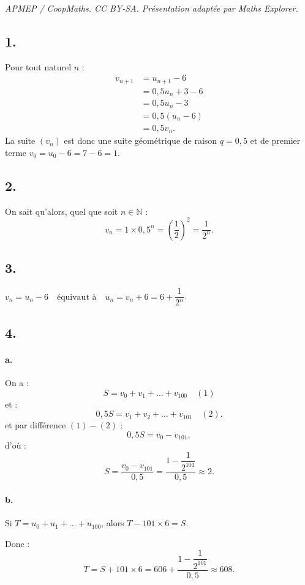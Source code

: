 \documentclass[10pt]{article}
\begin{document}
\noindent\textit{APMEP / CoopMaths. CC BY-SA. Présentation adaptée par Maths Explorer.}\par\medskip
\subsection*{1.}

Pour tout naturel \(n\) :
\begin{align*}
v_{n+1} &= u_{n+1} - 6 \\
&= 0{,}5u_n + 3 - 6 \\
&= 0{,}5u_n - 3 \\
&= 0{,}5(u_n - 6) \\
&= 0{,}5v_n.
\end{align*}
La suite \((v_n)\) est donc une suite géométrique de raison \(q = 0{,}5\) et de premier terme \( v_0 = u_0 - 6 = 7 - 6 = 1 \).

\subsection*{2.}

On sait qu'alors, quel que soit \(n \in \mathbb{N} \) :
\[
v_n = 1 \times 0{,}5^n = \left(\dfrac{1}{2}\right)^2 = \dfrac{1}{2^n}.
\]

\subsection*{3.}

\(v_n = u_n - 6 \quad \text{équivaut à} \quad u_n = v_n + 6 = 6 + \dfrac{1}{2^n}\).

\subsection*{4.}

\paragraph{a.} On a :
\[
S = v_0 + v_1 + \dots + v_{100} \quad (1)
\]
et :
\[
0{,}5S = v_1 + v_2 + \dots + v_{101} \quad (2).
\]
et par différence \((1) - (2)\) :
\[
0{,}5S = v_0 - v_{101},
\]
d'où :
\[
S = \dfrac{v_0 - v_{101}}{0,5} = \dfrac{1 - \dfrac{1}{2^{101}}}{0,5} \approx 2.
\]

\paragraph{b.} Si \( T = u_0 + u_1 + \dots + u_{100} \), alors \( T - 101 \times 6 = S \).

Donc :
\[
T = S + 101 \times 6 = 606 + \dfrac{1 - \dfrac{1}{2^{101}}}{0,5} \approx 608.
\]
\end{document}
